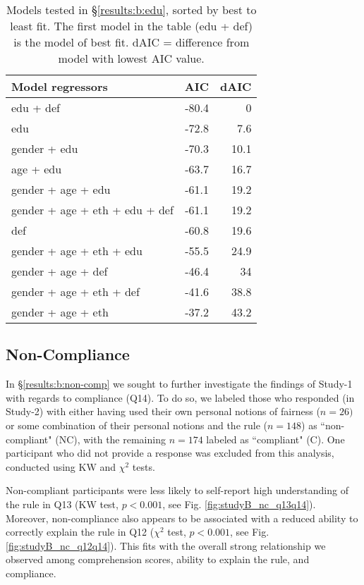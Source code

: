 \documentclass{article}
\newcommand{\studyA}{Study-1}
\newcommand{\studyB}{Study-2}
\begin{document}
\begin{table}[bht]
\centering
\caption{\label{tab:AIC} Models tested in \S\ref{results:b:edu}, sorted by best to least fit. The first model in the table (edu + def) is the model of best fit. dAIC = difference from model with lowest AIC value.}
\vspace{7pt}
{\small
\begin{tabular}{@{}lrr@{}}
    \toprule
    \textbf{Model regressors} & \textbf{AIC} & \textbf{dAIC} \\
    \midrule
    edu + def & -80.4 & 0 \\
    edu & -72.8 & 7.6 \\
    gender + edu & -70.3 & 10.1 \\
    age + edu & -63.7 & 16.7 \\
    gender + age + edu & -61.1 & 19.2 \\
    gender + age + eth + edu + def & -61.1 & 19.2 \\
    def & -60.8 & 19.6 \\
    gender + age + eth + edu & -55.5 & 24.9 \\
    gender + age + def & -46.4 & 34 \\
    gender + age + eth + def & -41.6 & 38.8 \\
    gender + age + eth & -37.2 & 43.2 \\
    \bottomrule
\end{tabular}}
\vspace{-10pt}
\end{table}

\subsection{Non-Compliance} \label{app:b:compliance}

In \S\ref{results:b:non-comp} we sought to further investigate the findings of \studyA{} with regards to compliance (Q14). To do so, we labeled those who responded (in \studyB{}) with either having used their own personal notions of fairness ($n=26)$ or some combination of their personal notions and the rule ($n=148$) as ``non-compliant" (NC), with the remaining $n=174$ labeled as ``compliant" (C). One participant who did not provide a response was excluded from this analysis, conducted using KW and $\chi^2$ tests.

Non-compliant participants were less likely to self-report high understanding of the rule in Q13 (KW test, $p<0.001$, see Fig. \ref{fig:studyB_nc_q13q14}). Moreover, non-compliance also appears to be associated with a reduced ability to correctly explain the rule in Q12 ($\chi^2$ test, $p<0.001$, see Fig. \ref{fig:studyB_nc_q12q14}). This fits with the overall strong relationship we observed among comprehension scores, ability to explain the rule, and compliance. 
\end{document}
